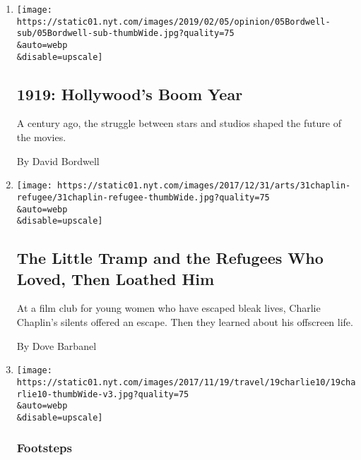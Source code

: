 \begin{enumerate}
\def\labelenumi{\arabic{enumi}.}
\item
  \href{/2019/02/05/opinion/hollywood-movies-1919.html}{}

  \texttt{[image: https://static01.nyt.com/images/2019/02/05/opinion/05Bordwell-sub/05Bordwell-sub-thumbWide.jpg?quality=75\\\&auto=webp\\\&disable=upscale]}

  \hypertarget{1919-hollywoods-boom-year}{%
  \subsection{1919: Hollywood's Boom
  Year}\label{1919-hollywoods-boom-year}}

  A century ago, the struggle between stars and studios shaped the
  future of the movies.

  By David Bordwell
\item
  \href{/2017/12/29/movies/the-little-tramp-and-the-refugees-who-loved-then-loathed-him.html}{}

  \texttt{[image: https://static01.nyt.com/images/2017/12/31/arts/31chaplin-refugee/31chaplin-refugee-thumbWide.jpg?quality=75\\\&auto=webp\\\&disable=upscale]}

  \hypertarget{the-little-tramp-and-the-refugees-who-loved-then-loathed-him}{%
  \subsection{The Little Tramp and the Refugees Who Loved, Then Loathed
  Him}\label{the-little-tramp-and-the-refugees-who-loved-then-loathed-him}}

  At a film club for young women who have escaped bleak lives, Charlie
  Chaplin's silents offered an escape. Then they learned about his
  offscreen life.

  By Dove Barbanel
\item
  \href{/2017/11/10/travel/chaplin-home-switzerland.html}{}

  \texttt{[image: https://static01.nyt.com/images/2017/11/19/travel/19charlie10/19charlie10-thumbWide-v3.jpg?quality=75\\\&auto=webp\\\&disable=upscale]}

  \hypertarget{footsteps}{%
  \subsubsection{Footsteps}\label{footsteps}}

  \hypertarget{charlie-chaplin-at-home-in-switzerland}{%
}
\end{enumerate}
